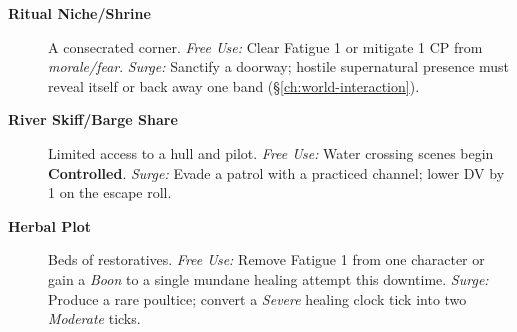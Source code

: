 \begin{description}
  \item[\textbf{Ritual Niche/Shrine}]  A consecrated corner. \emph{Free Use:} Clear Fatigue 1 or mitigate 1 CP from \emph{morale/fear}. \emph{Surge:} Sanctify a doorway; hostile supernatural presence must reveal itself or back away one band (\S\ref{ch:world-interaction}).
  \item[\textbf{River Skiff/Barge Share}]  Limited access to a hull and pilot. \emph{Free Use:} Water crossing scenes begin \textbf{Controlled}. \emph{Surge:} Evade a patrol with a practiced channel; lower DV by 1 on the escape roll.
  \item[\textbf{Herbal Plot}]  Beds of restoratives. \emph{Free Use:} Remove Fatigue 1 from one character or gain a \emph{Boon} to a single mundane healing attempt this downtime. \emph{Surge:} Produce a rare poultice; convert a \emph{Severe} healing clock tick into two \emph{Moderate} ticks.
\end{description}

